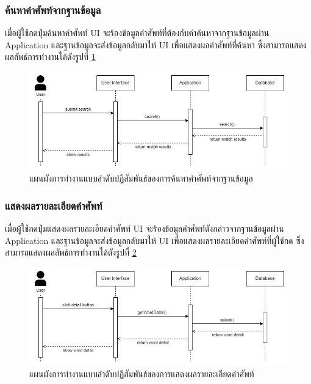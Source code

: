 \documentclass[12pt,oneside,openright,a4paper]{cpe-thai-project}
\begin{document}
\pagebreak
\subsubsection{ค้นหาคำศัพท์จากฐานข้อมูล}
\hspace{1cm}
เมื่อผู้ใช้กดปุ่มค้นหาคำศัพท์ UI จะร้องข้อมูลคำศัพท์ที่ต้องกับคำค้นหาจากฐานข้อมูลผ่าน Application
และฐานข้อมูลจะส่งข้อมูลกลับมาให้ UI เพื่อแสดงผลคำศัพท์ที่ค้นหา ซึ่งสามารถแสดงผลลัพธ์การทำงานได้ดังรูปที่ \ref{fig:S_SearchWord}
\begin{figure}[!h]\centering
	\includegraphics[width=\textwidth, keepaspectratio=true]{image/chap3/sequence/Search.jpg}
	\caption{แผนผังการทำงานแบบลำดับปฏิสัมพันธ์ของการค้นหาคำศัพท์จากฐานข้อมูล}\label{fig:S_SearchWord}
\end{figure}

\subsubsection{แสดงผลรายละเอียดคำศัพท์}
\hspace{1cm}
เมื่อผู้ใช้กดปุ่มแสดงผลรายละเอียดคำศัพท์ UI จะร้องข้อมูลคำศัพท์ดังกล่าวจากฐานข้อมูลผ่าน Application
และฐานข้อมูลจะส่งข้อมูลกลับมาให้ UI เพื่อแสดงผลรายละเอียดคำศัพท์ที่ผู้ใช้กด ซึ่งสามารถแสดงผลลัพธ์การทำงานได้ดังรูปที่ \ref{fig:S_WordDetail}
\begin{figure}[!h]\centering
	\includegraphics[width=\textwidth, keepaspectratio=true]{image/chap3/sequence/View-Search.jpg}
	\caption{แผนผังการทำงานแบบลำดับปฏิสัมพันธ์ของการแสดงผลรายละเอียดคำศัพท์}\label{fig:S_WordDetail}
\end{figure}
\end{document}
